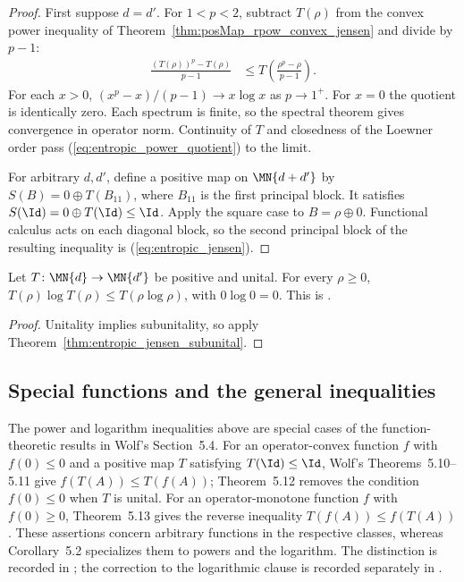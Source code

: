 \begin{proof}\leanok
    First suppose $d=d'$. For $1<p<2$, subtract $T(\rho)$ from the
    convex power inequality of Theorem~\ref{thm:posMap_rpow_convex_jensen}
    and divide by $p-1$:
    \begin{align}
        \frac{(T(\rho))^p-T(\rho)}{p-1}
        &\le T\left(\frac{\rho^p-\rho}{p-1}\right).
        \label{eq:entropic_power_quotient}
    \end{align}
    For each $x>0$, $(x^p-x)/(p-1)\to x\log x$ as $p\to1^+$.
    For $x=0$ the quotient is identically zero. Each spectrum is finite,
    so the spectral theorem gives convergence in operator norm.
    Continuity of $T$ and closedness of the Loewner order pass
    (\ref{eq:entropic_power_quotient}) to the limit.

    For arbitrary $d,d'$, define a positive map on $\MN{d+d'}$ by
    $S(B)=0\oplus T(B_{11})$, where $B_{11}$ is the first principal
    block. It satisfies $S(\Id)=0\oplus T(\Id)\le\Id$.
    Apply the square case to $B=\rho\oplus0$. Functional calculus acts
    on each diagonal block, so the second principal block of the resulting
    inequality is (\ref{eq:entropic_jensen}).
\end{proof}

\begin{theorem}
    \label{thm:entropic_jensen}
    \leanok
    Let $T\colon\MN{d}\to\MN{d'}$ be positive and unital.
    For every $\rho\ge0$, $T(\rho)\log T(\rho)\le T(\rho\log\rho)$,
    with $0\log0=0$. This is \cite[Corollary~5.1, Equation~(5.33)]{Wolf2012Quantum}.
\end{theorem}

\begin{proof}\leanok
    Unitality implies subunitality, so apply
    Theorem~\ref{thm:entropic_jensen_subunital}.
\end{proof}

\subsection{Special functions and the general inequalities}

The power and logarithm inequalities above are special cases of the
function-theoretic results in Wolf's Section~5.4.  For an operator-convex
function $f$ with $f(0)\le 0$ and a positive map $T$ satisfying
$T(\Id)\le\Id$, Wolf's Theorems~5.10--5.11 give
$f(T(A))\le T(f(A))$; Theorem~5.12 removes the condition $f(0)\le0$ when
$T$ is unital.  For an operator-monotone function $f$ with
$f(0)\ge 0$, Theorem~5.13 gives the reverse inequality
$T(f(A))\le f(T(A))$.  These assertions concern arbitrary functions in the
respective classes, whereas Corollary~5.2 specializes them to powers and the
logarithm.  The distinction is recorded in
\cite{gap:wolf_ch5_operator_convexity_scope}; the correction to the logarithmic
clause is recorded separately in \cite{gap:wolf_ch5_operator_jensen_lieb}.

